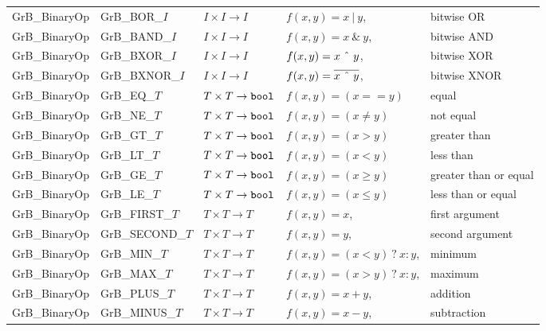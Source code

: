 \begin{table}
\begin{threeparttable}
\begin{tabular}{l|l|l|ll}
{\sf GrB\_BinaryOp}   & {\sf GrB\_BOR\_$I$}   & $I \times I \rightarrow I$ & $f(x,y) = x ~|~ y$, & bitwise OR \\
{\sf GrB\_BinaryOp}   & {\sf GrB\_BAND\_$I$}  & $I \times I \rightarrow I$ & $f(x,y) = x ~\&~ y$, & bitwise AND \\
{\sf GrB\_BinaryOp}   & {\sf GrB\_BXOR\_$I$}  & $I \times I \rightarrow I$ & $f(x,y) = x ~\mbox{\^{}}~ y$, & bitwise XOR \\
{\sf GrB\_BinaryOp}   & {\sf GrB\_BXNOR\_$I$} & $I \times I \rightarrow I$ & $f(x,y) = \overline{x ~\mbox{\^{}}~ y}$, & bitwise XNOR \\

{\sf GrB\_BinaryOp}   & {\sf GrB\_EQ\_$T$}    & $T \times T \rightarrow {\tt bool}$  & $f(x,y) = (x == y)$ & equal \\
{\sf GrB\_BinaryOp}   & {\sf GrB\_NE\_$T$}    & $T \times T \rightarrow {\tt bool}$  & $f(x,y) = (x \neq y)$ & not equal \\
{\sf GrB\_BinaryOp}   & {\sf GrB\_GT\_$T$}    & $T \times T \rightarrow {\tt bool}$  & $f(x,y) = (x > y)$ & greater than  \\
{\sf GrB\_BinaryOp}   & {\sf GrB\_LT\_$T$}    & $T \times T \rightarrow {\tt bool}$  & $f(x,y) = (x < y)$ & less than  \\
{\sf GrB\_BinaryOp}   & {\sf GrB\_GE\_$T$}    & $T \times T \rightarrow {\tt bool}$  & $f(x,y) = (x \geq y)$ & greater than or equal \\
{\sf GrB\_BinaryOp}   & {\sf GrB\_LE\_$T$}    & $T \times T \rightarrow {\tt bool}$  & $f(x,y) = (x \leq y)$ & less than or equal \\
{\sf GrB\_BinaryOp}   & {\sf GrB\_FIRST\_$T$} & $T \times T \rightarrow T$  & $f(x,y) = x$, & first argument \\
{\sf GrB\_BinaryOp}   & {\sf GrB\_SECOND\_$T$}& $T \times T \rightarrow T$  & $f(x,y) = y$, & second argument \\
{\sf GrB\_BinaryOp}   & {\sf GrB\_MIN\_$T$}   & $T \times T \rightarrow T$  & $f(x,y) = (x < y)~?~x : y$, & minimum \\
{\sf GrB\_BinaryOp}   & {\sf GrB\_MAX\_$T$}   & $T \times T \rightarrow T$  & $f(x,y) = (x > y)~?~x : y$, & maximum \\
{\sf GrB\_BinaryOp}   & {\sf GrB\_PLUS\_$T$}  & $T \times T \rightarrow T$  & $f(x,y) = x + y$, & addition \\
{\sf GrB\_BinaryOp}   & {\sf GrB\_MINUS\_$T$} & $T \times T \rightarrow T$  & $f(x,y) = x - y$, & subtraction \\

\end{tabular}
\end{threeparttable}
\end{table}

